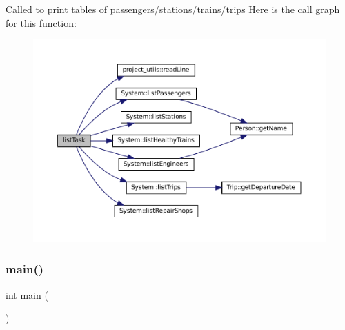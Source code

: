 Called to print tables of passengers/stations/trains/trips Here is the call graph for this function\+:
\nopagebreak
\begin{figure}[H]
\begin{center}
\leavevmode
\includegraphics[width=350pt]{Train-System_8cpp_a21054ad0cdbd7095b27ef9ac3396495b_cgraph}
\end{center}
\end{figure}
\mbox{\label{Train-System_8cpp_ae66f6b31b5ad750f1fe042a706a4e3d4}} 
\subsubsection{\texorpdfstring{main()}{main()}}
{\footnotesize\ttfamily int main (\begin{DoxyParamCaption}{ }\end{DoxyParamCaption})}

